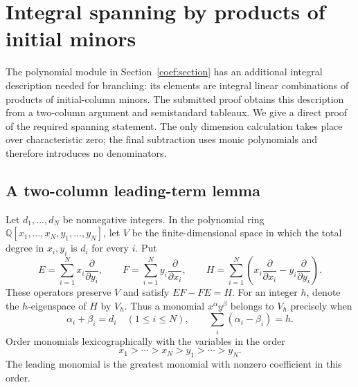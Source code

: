 \section{Integral spanning by products of initial minors}
\label{sm-section}

The polynomial module in Section~\ref{coef:section} has an additional
integral description needed for branching: its elements are integral
linear combinations of products of initial-column minors. The submitted
proof obtains this description from a two-column argument and
semistandard tableaux.\cite{alpo-uniform-source}
We give a direct proof of the required spanning statement. The only
dimension calculation takes place over characteristic zero; the final
subtraction uses monic polynomials and therefore introduces no
denominators.

\subsection{A two-column leading-term lemma}

Let $d_1,\ldots,d_N$ be nonnegative integers. In the polynomial ring
$\mathbb Q[x_1,\ldots,x_N,y_1,\ldots,y_N]$, let $V$ be the
finite-dimensional space in which the total degree in $x_i,y_i$ is
$d_i$ for every $i$. Put
\[
 E=\sum_{i=1}^N x_i\frac{\partial}{\partial y_i},\qquad
 F=\sum_{i=1}^N y_i\frac{\partial}{\partial x_i},\qquad
 H=\sum_{i=1}^N
 \left(x_i\frac{\partial}{\partial x_i}
             -y_i\frac{\partial}{\partial y_i}\right).
\]
These operators preserve $V$ and satisfy $EF-FE=H$.
For an integer $h$, denote the $h$-eigenspace of $H$ by $V_h$.
Thus a monomial $x^\alpha y^\beta$ belongs to $V_h$ precisely when
\[
 \alpha_i+\beta_i=d_i\quad(1\le i\le N),
 \qquad \sum_i(\alpha_i-\beta_i)=h.
\]
Order monomials lexicographically with the variables in the order
\begin{equation}\label{sm-two-order}
                   x_1>\cdots>x_N>y_1>\cdots>y_N.
\end{equation}
The leading monomial is the greatest monomial with nonzero coefficient
in this order.

